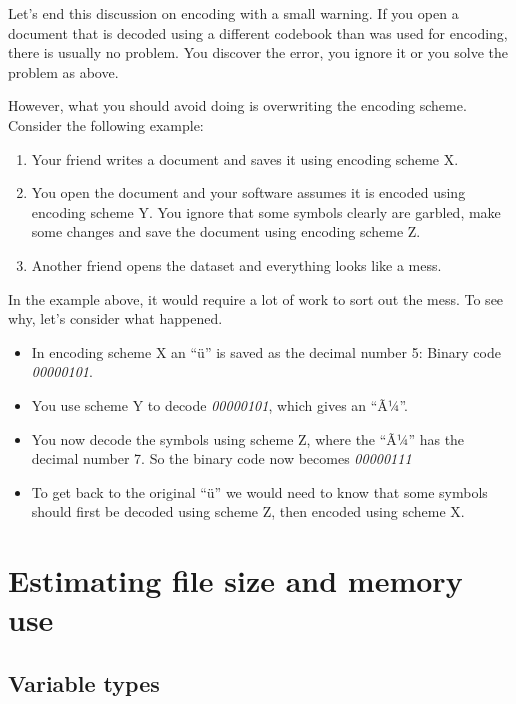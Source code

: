 \documentclass[
]{book}
\providecommand{\tightlist}{%
  \setlength{\itemsep}{0pt}\setlength{\parskip}{0pt}}
\begin{document}
Let's end this discussion on encoding with a small warning. If you open a document that is decoded using a different codebook than was used for encoding, there is usually no problem. You discover the error, you ignore it or you solve the problem as above.

However, what you should avoid doing is overwriting the encoding scheme. Consider the following example:

\begin{enumerate}
\def\labelenumi{\arabic{enumi}.}
\tightlist
\item
  Your friend writes a document and saves it using encoding scheme X.
\item
  You open the document and your software assumes it is encoded using encoding scheme Y. You ignore that some symbols clearly are garbled, make some changes and save the document using encoding scheme Z.
\item
  Another friend opens the dataset and everything looks like a mess.
\end{enumerate}

In the example above, it would require a lot of work to sort out the mess. To see why, let's consider what happened.

\begin{itemize}
\tightlist
\item
  In encoding scheme X an ``ü'' is saved as the decimal number 5: Binary code \emph{00000101}.
\item
  You use scheme Y to decode \emph{00000101}, which gives an ``Ã¼''.
\item
  You now decode the symbols using scheme Z, where the ``Ã¼'' has the decimal number 7. So the binary code now becomes \emph{00000111}
\item
  To get back to the original ``ü'' we would need to know that some symbols should first be decoded using scheme Z, then encoded using scheme X.
\end{itemize}

\hypertarget{estimating-file-size-and-memory-use}{%
\section{Estimating file size and memory use}\label{estimating-file-size-and-memory-use}}

\hypertarget{variable-types}{%
\subsection*{Variable types}\label{variable-types}}
\end{document}
